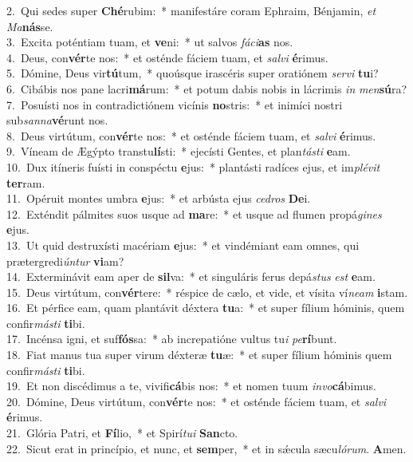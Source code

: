{2.~}Qui sedes super \textbf{Ché}rubim:~* manifestáre coram Ephraim, Bénjamin, \textit{et} \textit{Ma}\textbf{nás}se.\\
{3.~}Excita poténtiam tuam, et \textbf{ve}ni:~* ut salvos \textit{fá}\textit{ci}\textbf{as} nos.\\
{4.~}Deus, con\textbf{vér}te nos:~* et osténde fáciem tuam, et \textit{sal}\textit{vi} \textbf{é}rimus.\\
{5.~}Dómine, Deus vir\textbf{tú}tum,~* quoúsque irascéris super oratiónem \textit{ser}\textit{vi} \textbf{tu}i?\\
{6.~}Cibábis nos pane lacri\textbf{má}rum:~* et potum dabis nobis in lácrimis \textit{in} \textit{men}\textbf{sú}ra?\\
{7.~}Posuísti nos in contradictiónem vicínis \textbf{no}stris:~* et inimíci nostri sub\textit{san}\textit{na}\textbf{vé}runt nos.\\
{8.~}Deus virtútum, con\textbf{vér}te nos:~* et osténde fáciem tuam, et \textit{sal}\textit{vi} \textbf{é}rimus.\\
{9.~}Víneam de Ægýpto transtu\textbf{lí}sti:~* ejecísti Gentes, et plan\textit{tá}\textit{sti} \textbf{e}am.\\
{10.~}Dux itíneris fuísti in conspéctu \textbf{e}jus:~* plantásti radíces ejus, et im\textit{plé}\textit{vit} \textbf{ter}ram.\\
{11.~}Opéruit montes umbra \textbf{e}jus:~* et arbústa ejus \textit{ce}\textit{dros} \textbf{De}i.\\
{12.~}Exténdit pálmites suos usque ad \textbf{ma}re:~* et usque ad flumen propá\textit{gi}\textit{nes} \textbf{e}jus.\\
{13.~}Ut quid destruxísti macériam \textbf{e}jus:~* et vindémiant eam omnes, qui prætergredi\textit{ún}\textit{tur} \textbf{vi}am?\\
{14.~}Exterminávit eam aper de \textbf{sil}va:~* et singuláris ferus depá\textit{stus} \textit{est} \textbf{e}am.\\
{15.~}Deus virtútum, con\textbf{vér}tere:~* réspice de cælo, et vide, et vísita ví\textit{ne}\textit{am} \textbf{i}stam.\\
{16.~}Et pérfice eam, quam plantávit déxtera \textbf{tu}a:~* et super fílium hóminis, quem confir\textit{má}\textit{sti} \textbf{ti}bi.\\
{17.~}Incénsa igni, et suf\textbf{fós}sa:~* ab increpatióne vultus tu\textit{i} \textit{pe}\textbf{rí}bunt.\\
{18.~}Fiat manus tua super virum déxteræ \textbf{tu}æ:~* et super fílium hóminis quem confir\textit{má}\textit{sti} \textbf{ti}bi.\\
{19.~}Et non discédimus a te, vivifi\textbf{cá}bis nos:~* et nomen tuum \textit{in}\textit{vo}\textbf{cá}bimus.\\
{20.~}Dómine, Deus virtútum, con\textbf{vér}te nos:~* et osténde fáciem tuam, et \textit{sal}\textit{vi} \textbf{é}rimus.\\
{21.~}Glória Patri, et \textbf{Fí}lio,~* et Spirí\textit{tu}\textit{i} \textbf{San}cto.\\
{22.~}Sicut erat in princípio, et nunc, et \textbf{sem}per,~* et in sǽcula sæcu\textit{ló}\textit{rum}. \textbf{A}men.\\
